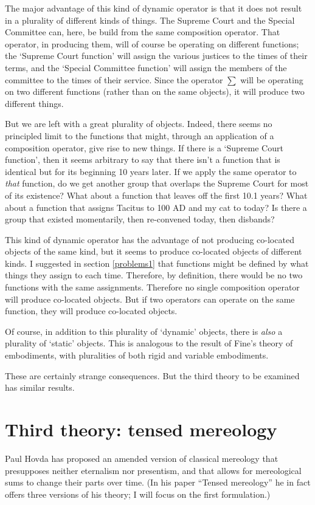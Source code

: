 \documentclass[11pt]{article}
\begin{document}
\begin{spacing}{1.5}
The major advantage of this kind of dynamic operator is that it does
not result in a plurality of different kinds of things.  The Supreme
Court and the Special Committee can, here, be build from the same
composition operator.  That operator, in producing them, will of
course be operating on different functions; the `Supreme Court
function' will assign the various justices to the times of their
terms, and the `Special Committee function' will assign the members of
the committee to the times of their service.  Since the operator
$\sum$ will be operating on two different functions (rather than on
the same objects), it will produce two different things.


But we are left with a great plurality of objects.  Indeed, there
seems no principled limit to the functions that might, through an
application of a composition operator, give rise to new things.  If
there is a `Supreme Court function', then it seems arbitrary to say
that there isn't a function that is identical but for its beginning 10
years later.  If we apply the same operator to {\em that} function, do
we get another group that overlaps the Supreme Court for most of its
existence?  What about a function that leaves off the first 10.1
years?  What about a function that assigns Tacitus to 100 AD and my
cat to today?  Is there a group that existed momentarily, then
re-convened today, then disbands?

This kind of dynamic operator has the advantage of not producing
co-located objects of the same kind, but it seems to produce
co-located objects of different kinds.  I suggested in section
\ref{problems1} that functions might be defined by what things they
assign to each time.  Therefore, by definition, there would be no two
functions with the same assignments.  Therefore no single composition
operator will produce co-located objects.  But if two operators can
operate on the same function, they will produce co-located objects.

Of course, in addition to this plurality of `dynamic' objects, there
is {\em also} a plurality of `static' objects.  This is analogous to
the result of Fine's theory of embodiments, with pluralities of both
rigid and variable embodiments.

These are certainly strange consequences.  But the third theory to be
examined has similar results.

\section{Third theory: tensed mereology}
\label{hovda}
Paul Hovda has proposed an amended version of classical mereology that
presupposes neither eternalism nor presentism, and that allows for
mereological sums to change their parts over time.  (In his paper
``Tensed mereology'' \citeyearpar{hovda2011} he in fact offers three
versions of his theory; I will focus on the first formulation.)


\end{spacing}
\end{document}

